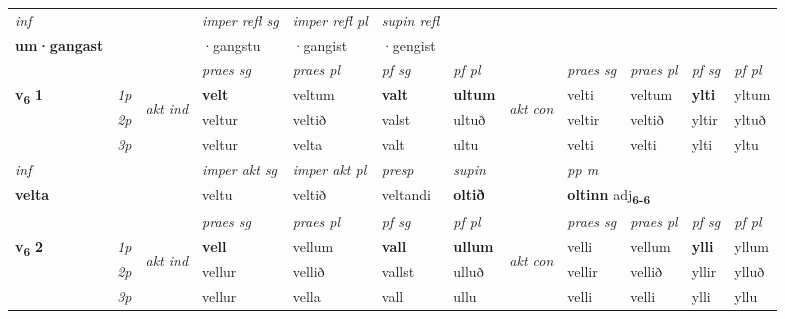 \begin{longtable}[l]{X>{\footnotesize\itshape}llXXXXlXXXX}
   {\textit{inf}} & &   & \textit{imper refl sg} & \textit{imper refl pl}   & \textit{supin refl}  \\*
  {\textbf{um\allowbreak ·gangast}} & &   & ·gangstu & ·gangist   & ·gengist  \\*

\midrule

 & &   & \textit{praes sg}  & \textit{praes pl}    & \textit{ pf sg} & \textit{pf pl} & & \textit{praes sg}  & \textit{praes pl}    & \textit{pf sg} & \textit{pf pl }  \\ \cmidrule{4-7} \cmidrule{9-12}
 \multirow{2}{*}{{{\textbf{v{\textsubscript{6}}} \Large{\textbf{1}}}}}  & 1p & \multirow{3}{*}{\begin{turn}{90}\textit{akt ind}\end{turn}} & \textbf{velt} & veltum & \textbf{valt} & \textbf{ultum} & \multirow{3}{*}{\begin{turn}{90}\textit{akt con}\end{turn}} &velti & veltum & \textbf{ylti} & yltum\\*
 & 2p &  &  veltur  & veltið & valst & ultuð & & veltir & veltið & yltir & yltuð \\*
 & 3p &  & veltur & velta & valt & ultu & & velti & velti& ylti & yltu \\*
\cmidrule{4-7} \cmidrule{9-12}

   {\textit{inf}} & &  & \textit{imper akt sg} & \textit{imper akt pl}   & \textit{presp} & \textit{supin}  && \textit{pp m} \\*
  {\textbf{velta}} & && veltu  & veltið   & veltandi &  \textbf{oltið}  && \multicolumn{2}{l}{\textbf{oltinn} adj\textbf{\textsubscript{6-6}}} \\*

\midrule

 & &   & \textit{praes sg}  & \textit{praes pl}    & \textit{ pf sg} & \textit{pf pl} & & \textit{praes sg}  & \textit{praes pl}    & \textit{pf sg} & \textit{pf pl }  \\ \cmidrule{4-7} \cmidrule{9-12}
 \multirow{2}{*}{{{\textbf{v{\textsubscript{6}}} \Large{\textbf{2}}}}}  & 1p & \multirow{3}{*}{\begin{turn}{90}\textit{akt ind}\end{turn}} & \textbf{vell} & vellum & \textbf{vall} & \textbf{ullum} & \multirow{3}{*}{\begin{turn}{90}\textit{akt con}\end{turn}} &velli & vellum & \textbf{ylli} & yllum\\*
 & 2p &  &  vellur  & vellið & vallst & ulluð & & vellir & vellið & yllir & ylluð \\*
 & 3p &  & vellur & vella & vall & ullu & & velli & velli& ylli & yllu \\*
\cmidrule{4-7} \cmidrule{9-12}


\end{longtable}
